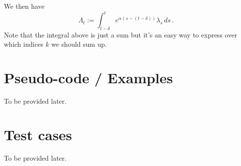 \documentclass[10pt]{amsart}
\begin{document}
We then have 
$$
\Lambda_t := \int_{t-\delta}^t e^{\alpha (s - (t-\delta))} \lambda_s \,ds\,.
$$
Note that the integral above is just a sum but it's an easy way to express over which indices $k$ we should sum up.


\section*{Pseudo-code / Examples}

To be provided later.

\section*{Test cases}

To be provided later.
\end{document}
